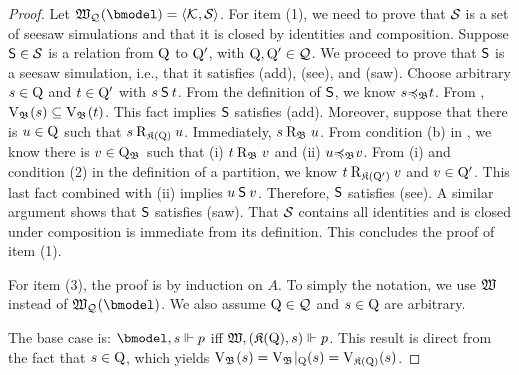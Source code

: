 
\begin{proof}
    Let $\wmofbm{\QQs} = \tuple{\Kof{}, \Sims}$.
    For item (1), we need to prove that $\mathcal{S}_{}$ is a set of seesaw simulations and that it is closed by identities and composition.
    Suppose $\mathbin{\mathsf{S}} \in \mathcal{S}_{}$ is a relation from $\mathrm{Q}$ to $\mathrm{Q}'$, with $\mathrm{Q},\mathrm{Q}' \in \mathcal{Q}_{}$.
    We proceed to prove that $\mathbin{\mathsf{S}}$ is a seesaw simulation, i.e., that it satisfies (add), (see), and (saw).
    Choose arbitrary $s \in \mathrm{Q}$ and $t \in \mathrm{Q}'$ with $s \mathbin{\mathsf{S}} t$.
    From the definition of $\mathbin{\mathsf{S}}$, we know $s {\preccurlyeq_{\mathfrak{B}}} t$.
    From , $\mathrm{V}_{\mathfrak{B}_{}}(s) \subseteq \mathrm{V}_{\mathfrak{B}_{}}(t)$.
    This fact implies $\mathbin{\mathsf{S}}$ satisfies (add).
    Moreover, suppose that there is $u \in \mathrm{Q}$ such that $s \mathbin{\mathrm{R}_{\mathfrak{K}(\mathrm{Q})}} u$.
    Immediately, $s \mathbin{\mathrm{R}_{\mathfrak{B}_{}}} u$.
    From condition (b) in , we know there is $v \in \mathrm{Q}_{\mathfrak{B}_{}}$ such that (i) $t \mathbin{\mathrm{R}_{\mathfrak{B}_{}}} v$ and (ii) $u {\preccurlyeq_{\mathfrak{B}}} v$.
    From (i) and condition (2) in the definition of a partition, we know $t \mathbin{\mathrm{R}_{\mathfrak{K}(\mathrm{Q}')}} v$ and $v \in \mathrm{Q}'$.
    This last fact combined with (ii) implies $u \mathbin{\mathsf{S}} v$.
    Therefore, $\mathbin{\mathsf{S}}$ satisfies (see).
    A similar argument shows that $\mathbin{\mathsf{S}}$ satisfies (saw).
    That $\mathcal{S}_{}$ contains all identities and is closed under composition is immediate from its definition.
    This concludes the proof of item (1).

    \medskip
    \noindent
    For item (3), the proof is by induction on $A$.
    To simply the notation, we use $\mathfrak{W}$ instead of $\wmofbm\QQs$.
    We also assume $\mathrm{Q} \in \mathcal{Q}_{}$ and $s \in \mathrm{Q}$ are arbitrary.

    \medskip
    \noindent
    The base case is: $\bforces s p$ iff ${\mathfrak{W},(\mathfrak{K}(\mathrm{Q}),s)}\Vdash{p}$.
    This result is direct from the fact that $s \in \mathrm{Q}$, which yields $\mathrm{V}_{\mathfrak{B}_{}}(s) = \mathrm{V}_{\mathfrak{B}_{}}\vert_{\mathrm{Q}}(s) =\mathrm{V}_{\mathfrak{K}(\mathrm{Q})}(s)$.
    

\end{proof}
